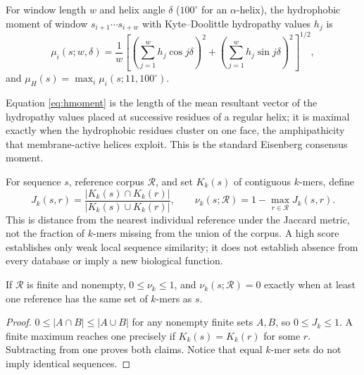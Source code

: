 \begin{definition}
For window length $w$ and helix angle $\delta$ ($100^\circ$ for an
$\alpha$-helix), the hydrophobic moment of window $s_{i+1}\cdots s_{i+w}$
with Kyte--Doolittle hydropathy values $h_j$ is
\begin{equation}
\mu_i(s; w, \delta) = \frac{1}{w}\left[\left(\sum_{j=1}^{w} h_j \cos j\delta\right)^2
  + \left(\sum_{j=1}^{w} h_j \sin j\delta\right)^2\right]^{1/2},
\label{eq:hmoment}
\end{equation}
and $\mu_H(s) = \max_i \mu_i(s; 11, 100^\circ)$.
\end{definition}

\begin{remark}
Equation \eqref{eq:hmoment} is the length of the mean resultant vector of
the hydropathy values placed at successive residues of a regular helix; it
is maximal exactly when the hydrophobic residues cluster on one face, the
amphipathicity that membrane-active helices exploit. This is the standard
Eisenberg consensus moment.
\end{remark}

\begin{definition}
For sequence $s$, reference corpus $\mathcal R$, and set $K_k(s)$ of
contiguous $k$-mers, define
\begin{equation}
J_k(s,r)=\frac{|K_k(s)\cap K_k(r)|}{|K_k(s)\cup K_k(r)|},\qquad
\nu_k(s;\mathcal R)=1-\max_{r\in\mathcal R} J_k(s,r).
\label{eq:novelty}
\end{equation}
This is distance from the nearest individual reference under the Jaccard
metric, not the fraction of $k$-mers missing from the union of the corpus.
A high score establishes only weak local sequence similarity; it does not
establish absence from every database or imply a new biological function.
\end{definition}

\begin{proposition}
If $\mathcal R$ is finite and nonempty, $0\leq\nu_k\leq1$,
and $\nu_k(s;\mathcal R)=0$ exactly when at least one reference has the same
set of $k$-mers as $s$.
\end{proposition}
\begin{proof}
$0\leq |A\cap B|\leq |A\cup B|$ for any nonempty finite sets $A,B$,
so $0\leq J_k\leq1$. A finite maximum reaches one precisely if
$K_k(s)=K_k(r)$ for some $r$. Subtracting from one proves both claims.
Notice that equal $k$-mer sets do not imply identical sequences.
\end{proof}

